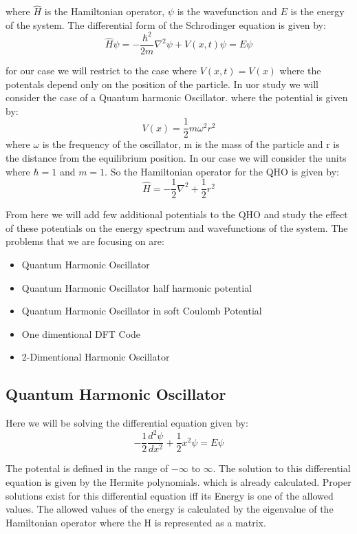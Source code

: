 \documentclass{article}
\begin{document}
\begin{multicols}{2}
where $\hat{H}$ is the Hamiltonian operator, $\psi$ is the wavefunction and $E$ is the energy of the system. The differential form of the Schrodinger equation is given by:
\begin{equation}
    \hat{H}\psi = -\frac{\hbar^2}{2m}\nabla^2\psi + V(x,t)\psi = E\psi
\end{equation}

for our case we will restrict to the case where $V(x,t) = V(x)$ where the potentals depend only on the position of the particle. In uor study we will consider the case of a Quantum harmonic Oscillator. where the potential is given by:
\begin{equation}
    V(x) = \frac{1}{2}m\omega^2r^2
\end{equation}
where $\omega$ is the frequency of the oscillator, m is the mass of the particle and r is the distance from the equilibrium position. In our case we will consider the units where $\hbar = 1$ and $m = 1$. So the Hamiltonian operator for the QHO is given by:
\begin{equation}
    \hat{H} = -\frac{1}{2}\nabla^2 + \frac{1}{2}r^2
\end{equation}

From here we will add few additional potentials to the QHO and study the effect of these potentials on the energy spectrum and wavefunctions of the system. 
The problems that we are focusing on are:
\begin{itemize}
    \item Quantum Harmonic Oscillator
    \item Quantum Harmonic Oscillator half harmonic potential
    \item Quantum Harmonic Oscillator in soft Coulomb Potential
    \item One dimentional DFT Code
    \item 2-Dimentional Harmonic Oscillator
\end{itemize}


\subsection{\label{QHO}Quantum Harmonic Oscillator}
Here we will be solving the differential equation given by:
\begin{equation}
    -\frac{1}{2}\frac{d^2\psi}{dx^2} + \frac{1}{2}x^2\psi = E\psi
\end{equation}

The potental is defined in the range of $-\infty$ to $\infty$. The solution to this differential equation is given by the Hermite polynomials. which is already calculated.
Proper solutions exist for this  differential equation iff its Energy is one of the allowed values. The allowed values of the energy is calculated by the eigenvalue of the Hamiltonian operator where the H is represented as a matrix.


\end{multicols}
\end{document}
